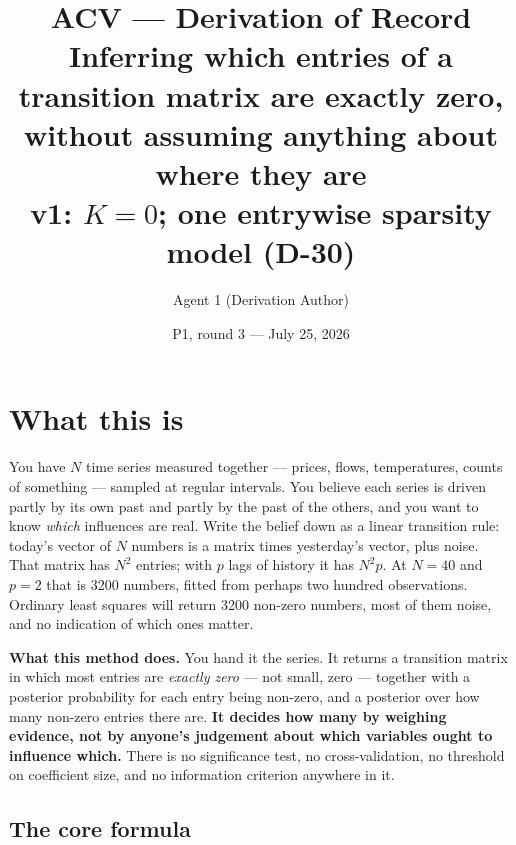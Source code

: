 \title{ACV --- Derivation of Record\\[1ex]
  {\large Inferring which entries of a transition matrix are exactly zero,
   without assuming anything about where they are}\\[1ex]
  {\normalsize v1: $K=0$; one entrywise sparsity model (D-30)}}
\author{Agent 1 (Derivation Author)}
\date{P1, round 3 --- July 25, 2026}

\maketitle


\section*{What this is}

You have $N$ time series measured together --- prices, flows, temperatures, counts
of something --- sampled at regular intervals. You believe each series is driven
partly by its own past and partly by the past of the others, and you want to know
\emph{which} influences are real. Write the belief down as a linear transition rule:
today's vector of $N$ numbers is a matrix times yesterday's vector, plus noise. That
matrix has $N^2$ entries; with $p$ lags of history it has $N^2p$. At $N=40$ and $p=2$
that is 3200 numbers, fitted from perhaps two hundred observations. Ordinary least
squares will return 3200 non-zero numbers, most of them noise, and no indication of
which ones matter.

\textbf{What this method does.} You hand it the series. It returns a transition
matrix in which most entries are \emph{exactly zero} --- not small, zero ---
together with a posterior probability for each entry being non-zero, and a posterior
over how many non-zero entries there are. \textbf{It decides how many by weighing
evidence, not by anyone's judgement about which variables ought to influence which.}
There is no significance test, no cross-validation, no threshold on coefficient size,
and no information criterion anywhere in it.

\subsection*{The core formula}


